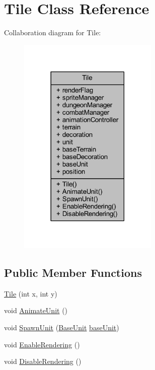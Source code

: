 \hypertarget{class_tile}{}\section{Tile Class Reference}
\label{class_tile}


Collaboration diagram for Tile\+:\nopagebreak
\begin{figure}[H]
\begin{center}
\leavevmode
\includegraphics[width=189pt]{class_tile__coll__graph}
\end{center}
\end{figure}
\subsection*{Public Member Functions}
\begin{DoxyCompactItemize}
\item 
\mbox{\hyperlink{class_tile_ac4b178062ea8879968150b8a79830267}{Tile}} (int x, int y)
\item 
void \mbox{\hyperlink{class_tile_a87c523416006468a2791d61bf3be54ca}{Animate\+Unit}} ()
\item 
void \mbox{\hyperlink{class_tile_a183188c193a2ba5b62c8cdfc6d63471d}{Spawn\+Unit}} (\mbox{\hyperlink{class_base_unit}{Base\+Unit}} \mbox{\hyperlink{class_tile_a2d5020851ac36840a83e8933da9c2b1e}{base\+Unit}})
\item 
void \mbox{\hyperlink{class_tile_a1baa5fe3ab8f887e8985a85fba21210a}{Enable\+Rendering}} ()
\item 
void \mbox{\hyperlink{class_tile_abf58797ff0c2df3eddfc9854c3f61dd2}{Disable\+Rendering}} ()
\end{DoxyCompactItemize}
